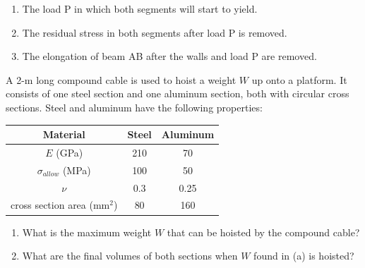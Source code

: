 \documentclass[
10pt,
a4paper,
openany,
svgnames,
]{book} %
\begin{document}
\begin{exercises}
  \begin{enumerate}
  \item The load P in which both segments will start to yield.
  \item The residual stress in both segments after load P is removed.
  \item The elongation of beam AB after the walls and load P are removed.
  \end{enumerate}

  \exercise A 2-m long compound cable is used to hoist a weight $W$ up onto a platform. It consists of one steel section and one aluminum section, both with circular cross sections. Steel and aluminum have the following properties: 

  \begin{table}[H]
    \centering
    \begin{tabular}{  c c c }
      \toprule
      Material & Steel & Aluminum \\
      \midrule
      $E$ (GPa) & 210 & 70 \\
      $\sigma_{allow}$ (MPa) & 100 & 50 \\
      $\nu$	&	0.3	&	0.25 \\
      cross section area (mm$^2$) & 80 & 160 \\
      \bottomrule
    \end{tabular}
  \end{table}

  \begin{figure}[H]
    \centering
  \end{figure}
  
  \begin{enumerate}
  \item What is the maximum weight $W$ that can be hoisted by the compound cable?
  \item What are the final volumes of both sections when $W$ found in (a) is hoisted?
  \end{enumerate}


\end{exercises}
\end{document}
